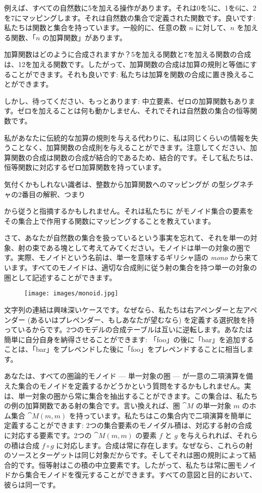 例えば、すべての自然数に5を加える操作があります。それは0を5に、1を6に、2を7にマッピングします。それは自然数の集合で定義された関数です。良いです: 私たちは関数と集合を持っています。一般的に、任意の数 $n$ に対して、$n$ を加える関数、「$n$ の加算関数」があります。

加算関数はどのように合成されますか？5を加える関数と7を加える関数の合成は、12を加える関数です。したがって、加算関数の合成は加算の規則と等価にすることができます。それも良いです: 私たちは加算を関数の合成に置き換えることができます。

しかし、待ってください、もっとあります: 中立要素、ゼロの加算関数もあります。ゼロを加えることは何も動かしません、それでそれは自然数の集合の恒等関数です。

私があなたに伝統的な加算の規則を与える代わりに、私は同じくらいの情報を失うことなく、加算関数の合成則を与えることができます。注意してください、加算関数の合成は関数の合成が結合的であるため、結合的です。そして私たちは、恒等関数に対応するゼロ加算関数を持っています。

気付くかもしれない識者は、整数から加算関数へのマッピングが  の型シグネチャの2番目の解釈、つまり

  から従うと指摘するかもしれません。それは私たちに  がモノイド集合の要素をその集合上で作用する関数にマッピングすることを教えています。

さて、あなたが自然数の集合を扱っているという事実を忘れて、それを単一の対象、射の束である塊として考えてみてください。モノイドは単一の対象の圏です。実際、モノイドという名前は、単一を意味するギリシャ語の \emph{mono} から来ています。すべてのモノイドは、適切な合成則に従う射の集合を持つ単一の対象の圏として記述することができます。

\begin{figure}[H]
  \centering
  \texttt{[image: images/monoid.jpg]}
\end{figure}

\noindent
文字列の連結は興味深いケースです。なぜなら、私たちは右アペンダーと左アペンダー (あるいはプレペンダー、もしあなたが望むなら) を定義する選択肢を持っているからです。2つのモデルの合成テーブルは互いに逆転します。あなたは簡単に自分自身を納得させることができます: 「foo」の後に「bar」を追加することは、「bar」をプレペンドした後に「foo」をプレペンドすることに相当します。

あなたは、すべての圏論的モノイド --- 単一対象の圏 --- が一意の二項演算を備えた集合のモノイドを定義するかどうかという質問をするかもしれません。実は、単一対象の圏から常に集合を抽出することができます。この集合は、私たちの例の加算関数である射の集合です。言い換えれば、圏 \(\cat{M}\) の単一対象 \(m\) のホム集合 \(\cat{M}(m, m)\) を持っています。私たちはこの集合内で二項演算を簡単に定義することができます: 2つの集合要素のモノイダル積は、対応する射の合成に対応する要素です。2つの \(\cat{M}(m, m)\) の要素 \(f\) と \(g\) を与えられれば、それらの積は合成 \(f \circ g\) に対応します。合成は常に存在します。なぜなら、これらの射のソースとターゲットは同じ対象だからです。そしてそれは圏の規則によって結合的です。恒等射はこの積の中立要素です。したがって、私たちは常に圏モノイドから集合モノイドを復元することができます。すべての意図と目的において、彼らは同一です。

